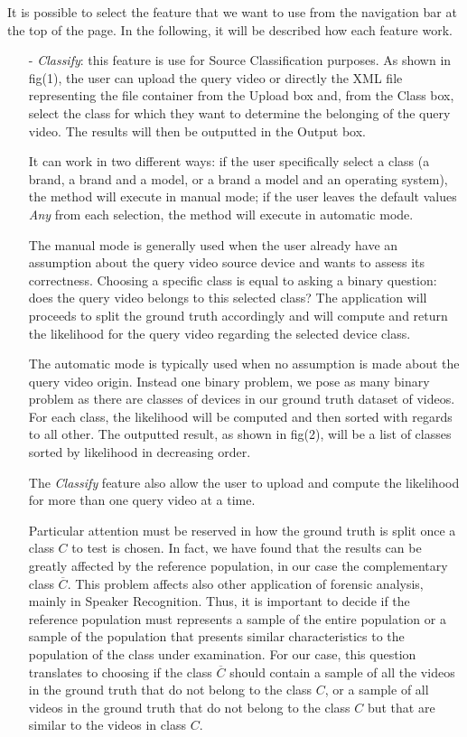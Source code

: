 It is possible to select the feature that we want to use from the navigation bar at the top of the page. In the following, it will be described how each feature work.

\begin{itemize}

\item[-] \emph{Classify}: this feature is use for Source Classification purposes. As shown in fig(1), the user can upload the query video or directly the XML file representing the file container from the Upload box and, from the Class box, select the class for which they want to determine the belonging of the query video. The results will then be outputted in the Output box. 

It can work in two different ways: if the user specifically select a class (a brand, a brand and a model, or a brand a model and an operating system), the method will execute in manual mode; if the user leaves the default values \emph{Any} from each selection, the method will execute in automatic mode.

The manual mode is generally used when the user already have an assumption about the query video source device and wants to assess its correctness. Choosing a specific class is equal to asking a binary question: does the query video belongs to this selected class? The application will proceeds to split the ground truth accordingly and will compute and return the likelihood for the query video regarding the selected device class.

The automatic mode is typically used when no assumption is made about the query video origin. Instead one binary problem, we pose as many binary problem as there are classes of devices in our ground truth dataset of videos. For each class, the likelihood will be computed and then sorted with regards to all other. The outputted result, as shown in fig(2), will be a list of classes sorted by likelihood in decreasing order.

The \emph{Classify} feature also allow the user to upload and compute the likelihood for more than one query video at a time.

Particular attention must be reserved in how the ground truth is split once a class $C$ to test is chosen. In fact, we have found that the results can be greatly affected by the reference population, in our case the complementary class $\overline{C}$. This problem affects also other application of forensic analysis, mainly in Speaker Recognition. Thus, it is important to decide if the reference population must represents a sample of the entire population or a sample of the population that presents similar characteristics to the population of the class under examination. For our case, this question translates to choosing if the class $\overline{C}$ should contain a sample of all the videos in the ground truth that do not belong to the class $C$, or a sample of all videos in the ground truth that do not belong to the class $C$ but that are similar to the videos in class $C$.


\end{itemize}
